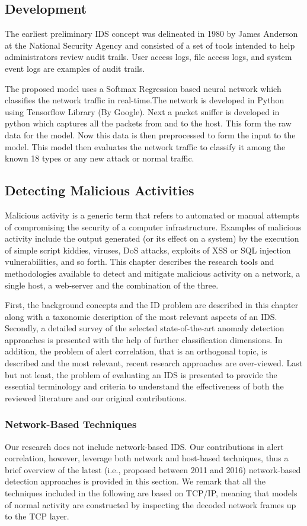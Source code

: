 \documentclass[12pt]{article}
\theoremstyle{definition}
\begin{document}
		
		\subsection{Development}
		The earliest preliminary IDS concept was delineated in 1980 by James Anderson at the National Security Agency and consisted of a set of tools intended to help administrators review audit trails. User access logs, file access logs, and system event logs are examples of audit trails.
		
		The proposed model uses a Softmax Regression based neural network which classifies the network traffic in real-time.The network is developed in Python using Tensorflow Library (By Google). Next a packet sniffer is developed in python which captures all the packets from and to the host. This form the raw data for the model. Now this data is then preprocessed to form the input to the model. This model then evaluates the network traffic to classify it among the known 18 types or any new attack or normal traffic.
			
		\subsection{Detecting Malicious Activities}
		Malicious activity is a generic term that refers to automated or manual attempts of compromising the security of a computer infrastructure. Examples of malicious activity include the output generated (or its effect on a system) by the execution of simple script kiddies, viruses, DoS attacks, exploits of XSS or SQL injection vulnerabilities, and so forth. This chapter describes the research tools and methodologies available to detect and
		mitigate malicious activity on a network, a single host, a web-server and the combination of the three.
		
		First, the background concepts and the ID problem are described in this chapter along with a taxonomic description of the most relevant aspects of an IDS. Secondly, a detailed survey of the selected state-of-the-art anomaly detection approaches is presented with the help of further classification dimensions. In addition, the problem of alert correlation, that is an orthogonal topic, is described and the most relevant, recent research approaches are over-viewed. Last but not least, the problem of evaluating an IDS is presented to provide the essential terminology and criteria to understand the effectiveness of both the reviewed literature and our original contributions.
			\subsubsection{Network-Based Techniques}
			Our research does not include network-based IDS. Our contributions in alert correlation, however, leverage both network and host-based techniques, thus a brief overview of the latest (i.e., proposed between 2011 and 2016) network-based detection approaches is provided in this section. We remark that all the techniques included in the following are based on TCP/IP, meaning that models of normal activity are constructed by inspecting the decoded network frames up to the TCP layer.
			
\end{document}
